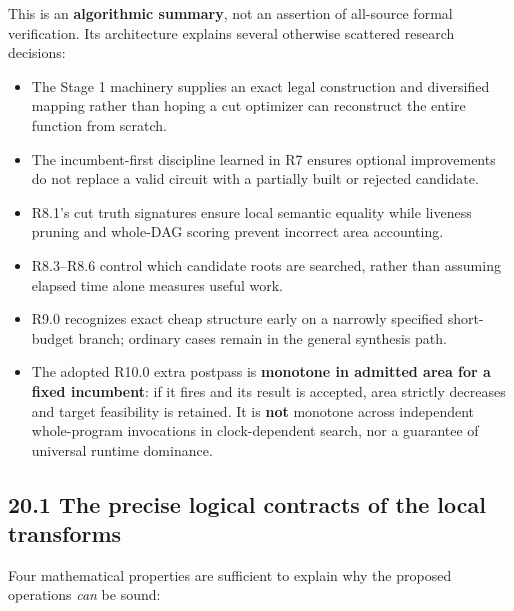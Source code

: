 This is an \textbf{algorithmic summary}, not an assertion of all-source formal verification. Its architecture explains several otherwise scattered research decisions:

\begin{itemize}
\tightlist
\item
  The Stage 1 machinery supplies an exact legal construction and diversified mapping rather than hoping a cut optimizer can reconstruct the entire function from scratch.
\item
  The incumbent-first discipline learned in R7 ensures optional improvements do not replace a valid circuit with a partially built or rejected candidate.
\item
  R8.1's cut truth signatures ensure local semantic equality while liveness pruning and whole-DAG scoring prevent incorrect area accounting.
\item
  R8.3--R8.6 control which candidate roots are searched, rather than assuming elapsed time alone measures useful work.
\item
  R9.0 recognizes exact cheap structure early on a narrowly specified short-budget branch; ordinary cases remain in the general synthesis path.
\item
  The adopted R10.0 extra postpass is \textbf{monotone in admitted area for a fixed incumbent}: if it fires and its result is accepted, area strictly decreases and target feasibility is retained. It is \textbf{not} monotone across independent whole-program invocations in clock-dependent search, nor a guarantee of universal runtime dominance.
\end{itemize}

\subsection{20.1 The precise logical contracts of the local transforms}\label{the-precise-logical-contracts-of-the-local-transforms}

Four mathematical properties are sufficient to explain why the proposed operations \emph{can} be sound:

